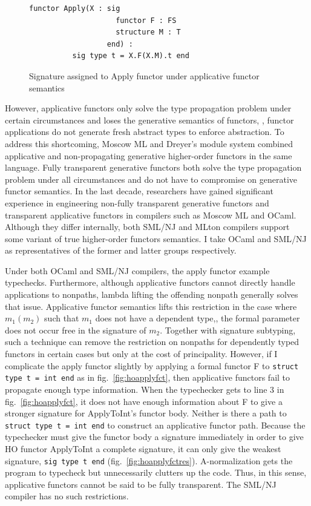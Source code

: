 \documentclass[12pt]{article}
\begin{document}
\begin{figure}
\begin{lstlisting}
functor Apply(X : sig 
                    functor F : FS 
                    structure M : T 
                  end) :
          sig type t = X.F(X.M).t end
\end{lstlisting}
\caption{Signature assigned to Apply functor under applicative functor semantics}
\label{fig:appapplysig}
\end{figure}

However, applicative functors only solve the type propagation problem under certain circumstances and loses the generative semantics of functors, \ie, functor applications do not generate fresh abstract types to enforce abstraction. To address this shortcoming, Moscow ML and Dreyer's module system\cite{dhc03} combined applicative and non-propagating generative higher-order functors in the same language. Fully transparent generative functors both solve the type propagation problem under all circumstances and do not have to compromise on generative functor semantics. In the last decade, researchers have gained significant experience in engineering non-fully transparent generative functors and transparent applicative functors in compilers such as Moscow ML and OCaml. Although they differ internally, both SML/NJ and MLton compilers support some variant of true higher-order functors semantics. I take OCaml and SML/NJ as representatives of the former and latter groups respectively.
	 
Under both OCaml and SML/NJ compilers, the apply functor example typechecks. Furthermore, although applicative functors cannot directly handle applications to nonpaths, lambda lifting the offending nonpath generally solves that issue. Applicative functor semantics lifts this restriction in the case where $m_1(m_2)$ such that $m_1$ does not have a dependent type,\ie, the formal parameter does not occur free in the signature of $m_2$. Together with signature subtyping, such a technique can remove the restriction on nonpaths for dependently typed functors in certain cases but only at the cost of principality. However, if I complicate the apply functor slightly by applying a formal functor F to \lstinline{struct type t = int end} as in fig.~\ref{fig:hoapplyfct}, then applicative functors fail to propagate enough type information. When the typechecker gets to line 3 in fig.~\ref{fig:hoapplyfct}, it does not have enough information about F to give a stronger signature for ApplyToInt's functor body. Neither is there a path to \lstinline{struct type t = int end} to construct an applicative functor path. Because the typechecker must give the functor body a signature immediately in order to give HO functor ApplyToInt a complete signature, it can only give the weakest signature, \lstinline{sig type t end} (fig.~\ref{fig:hoapplyfctres}). A-normalization gets the program to typecheck but unnecessarily clutters up the code. Thus, in this sense, applicative functors cannot be said to be fully transparent. The SML/NJ compiler has no such restrictions.
\end{document}
